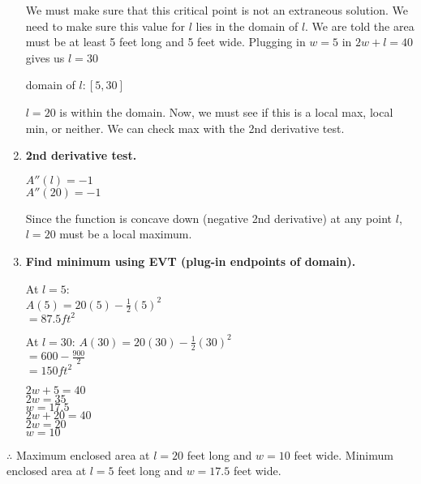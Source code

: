 \documentclass[12pt,fleqn]{book} %
\begin{document}
\begin{enumerate}
          \normalsize{We must make sure that this critical point is not an extraneous solution. We need to make sure this value for $l$ lies in the domain of $l$. We are told
              the area must be at least 5 feet long and 5 feet wide. Plugging in $w=5$ in $2w+l=40$ gives us $l=30$}
          \begin{center}
              domain of $l: [5, 30]$
          \end{center}
          \normalsize{$l=20$ is within the domain. Now, we must see if this is a local max, local min, or neither. We can check max with the 2nd derivative test.}
    \item \large{\textbf{2nd derivative test.}} \\
          \begin{center}
              $A''(l)=-1$ \\
              $A''(20)=-1$
          \end{center}
          \normalsize{Since the function is concave down (negative 2nd derivative) at any point $l$, $l=20$ must be a local maximum.}
    \item \large{\textbf{Find minimum using EVT (plug-in endpoints of domain).}} \\
          \begin{multicols}{2}
              \begin{center}
                  At $l=5$: \\
                  $A(5) = 20(5)-\frac{1}{2}(5)^2$ \\
                  \textbf{$= 87.5 ft^2$}

                  \columnbreak

                  At $l=30$:
                  $A(30) = 20(30)-\frac{1}{2}(30)^2$ \\
                  $= 600-\frac{900}{2}$ \\
                  $=150 ft^2$

              \end{center}
          \end{multicols}

          \begin{multicols}{2}
              \begin{center}
                  $2w+5=40$ \\
                  $2w=35$ \\
                  $w=17.5$ \\

                  \columnbreak
                  $2w+20=40$ \\
                  $2w=20$ \\
                  $w=10$

              \end{center}
          \end{multicols}

\end{enumerate}
\normalsize{$\therefore$ Maximum enclosed area at $l=20$ feet long and $w=10$ feet wide. Minimum enclosed area at $l=5$ feet long and $w=17.5$ feet wide.}
\end{document}
